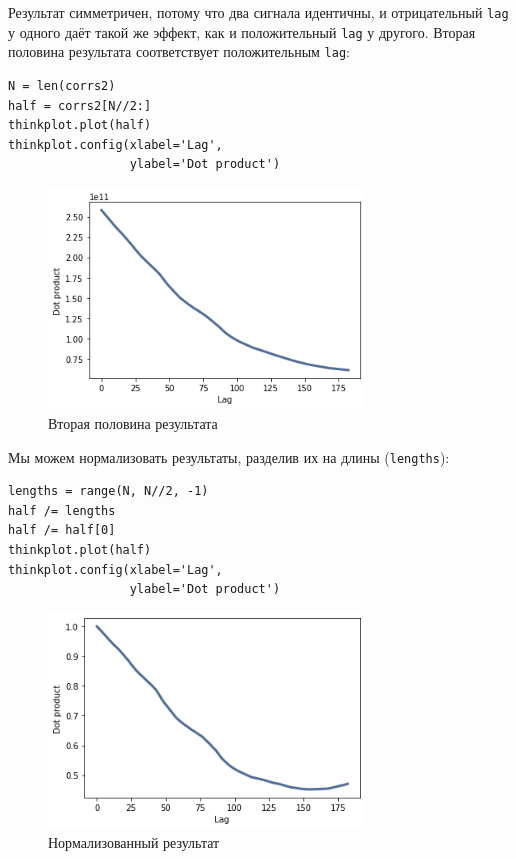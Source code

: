 \documentclass[a4paper,12pt]{report}
\begin{document}
Результат симметричен, потому что два сигнала идентичны, и отрицательный \texttt{lag} у одного даёт такой же эффект, как и положительный \texttt{lag} у другого. Вторая половина результата соответствует положительным \texttt{lag}:

\begin{lstlisting}[caption=Вторая половина результата]
N = len(corrs2)
half = corrs2[N//2:]
thinkplot.plot(half)
thinkplot.config(xlabel='Lag',
                 ylabel='Dot product')
\end{lstlisting}

\begin{figure}[H]
        \centering
        \includegraphics[width=0.75\textwidth]{lab5_fig3_5.png}
        \caption{Вторая половина результата}
        \label{fig:lab5_fig3_5}
\end{figure}

Мы можем нормализовать результаты, разделив их на длины (\texttt{lengths}):

\begin{lstlisting}[caption=Нормализованный результат]
lengths = range(N, N//2, -1)
half /= lengths
half /= half[0]
thinkplot.plot(half)
thinkplot.config(xlabel='Lag',
                 ylabel='Dot product')
\end{lstlisting}

\begin{figure}[H]
        \centering
        \includegraphics[width=0.75\textwidth]{lab5_fig3_6.png}
        \caption{Нормализованный результат}
        \label{fig:lab5_fig3_6}
\end{figure}
\end{document}
